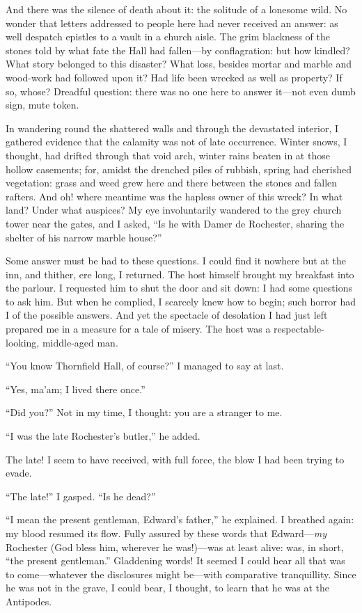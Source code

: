 And there was the silence of death about it: the solitude of a lonesome
wild. No wonder that letters addressed to people here had never
received an answer: as well despatch epistles to a vault in a church
aisle. The grim blackness of the stones told by what fate the Hall had
fallen---by conflagration: but how kindled? What story belonged to this
disaster? What loss, besides mortar and marble and wood-work had
followed upon it? Had life been wrecked as well as property? If so,
whose? Dreadful question: there was no one here to answer it---not even
dumb sign, mute token.

In wandering round the shattered walls and through the devastated
interior, I gathered evidence that the calamity was not of late
occurrence. Winter snows, I thought, had drifted through that void
arch, winter rains beaten in at those hollow casements; for, amidst the
drenched piles of rubbish, spring had cherished vegetation: grass and
weed grew here and there between the stones and fallen rafters. And oh!
where meantime was the hapless owner of this wreck? In what land?
Under what auspices? My eye involuntarily wandered to the grey church
tower near the gates, and I asked, \enquote{Is he with Damer de
	Rochester, sharing the shelter of his narrow marble house?}

Some answer must be had to these questions. I could find it nowhere but
at the inn, and thither, ere long, I returned. The host himself brought
my breakfast into the parlour. I requested him to shut the door and sit
down: I had some questions to ask him. But when he complied, I scarcely
knew how to begin; such horror had I of the possible answers. And yet
the spectacle of desolation I had just left prepared me in a measure for
a tale of misery. The host was a respectable-looking, middle-aged man.

\enquote{You know Thornfield Hall, of course?} I managed to say at last.

\enquote{Yes, ma'am; I lived there once.}

\enquote{Did you?} Not in my time, I thought: you are a stranger to me.

\enquote{I was the late \Mr{} Rochester's butler,} he added.

The late! I seem to have received, with full force, the blow I had been
trying to evade.

\enquote{The late!} I gasped. \enquote{Is he dead?}

\enquote{I mean the present gentleman, \Mr{} Edward's father,} he
explained. I breathed again: my blood resumed its flow. Fully assured
by these words that \Mr{} Edward---\emph{my} \Mr{} Rochester (God bless him,
wherever he was!)---was at least alive: was, in short, \enquote{the
	present gentleman.} Gladdening words! It seemed I could hear all that
was to come---whatever the disclosures might be---with comparative
tranquillity. Since he was not in the grave, I could bear, I thought,
to learn that he was at the Antipodes.

